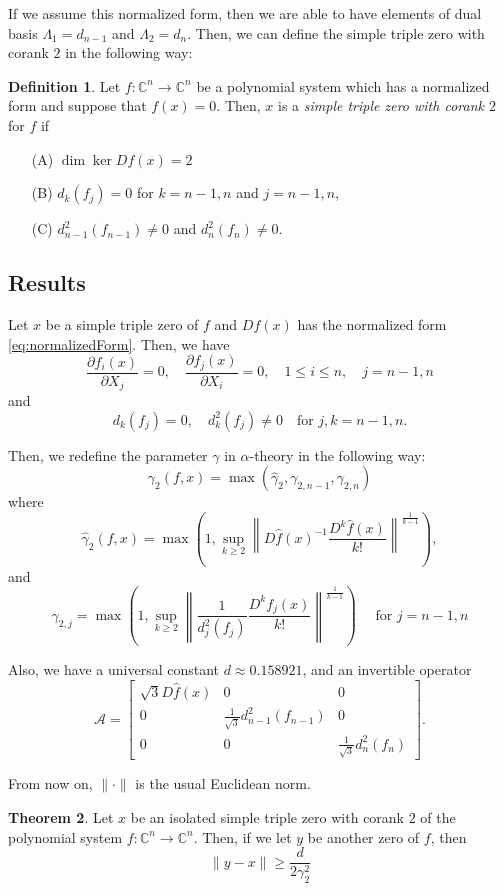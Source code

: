 \documentclass[12pt,oneside,reqno]{amsart}
\theoremstyle{definition}
\newtheorem{thm}{Theorem}
\newtheorem{defi}[thm]{Definition}
\begin{document}
If we assume this normalized form, then we are able to have elements of dual basis $\Lambda_1=d_{n-1}$ and $\Lambda_2=d_n$. Then, we can define the simple triple zero with corank $2$ in the following way:
\begin{defi}
 Let $f:\mathbb{C}^n\rightarrow\mathbb{C}^n$ be a polynomial system which has a normalized form and suppose that $f(x)=0$. Then, $x$ is a {\it simple triple zero with corank $2$} for $f$ if
 \begin{itemize}
 	\item[(A)] $\dim\ker Df(x)=2$
 	\item[(B)] $d_k(f_j)=0$ for $k=n-1,n$ and $j=n-1,n$,
 	\item[(C)] $d_{n-1}^2(f_{n-1})\ne0$ and $d_{n}^2(f_{n})\ne0$.
 	\end{itemize}
	
\end{defi}


\subsection{Results}
Let $x$ be a simple triple zero of $f$ and $Df(x)$ has the normalized form \ref{eq:normalizedForm}. Then, we have 
\[\frac{\partial f_i(x)}{\partial X_j}=0,\quad \frac{\partial f_j(x)}{\partial X_i}=0, \quad 1\leq i\leq n,\quad j=n-1,n\]
and
\[d_k(f_j)=0,\quad d_k^2(f_j)\ne 0\quad \text{for }j,k=n-1,n.\]

Then, we redefine the parameter $\gamma$ in $\alpha$-theory in the following way:
$$\gamma_2(f,x)=\max(\hat{\gamma}_2,\gamma_{2,n-1},\gamma_{2,n})$$
where
\[\hat{\gamma}_2(f,x)=\max\left(1,\sup\limits_{k\geq 2}\left\|D\hat{f}(x)^{-1}\frac{D^k\hat{f}(x)}{k!}\right\|^{\frac{1}{k-1}}\right),\]
and
\[\gamma_{2,j}=\max\left(1,\sup\limits_{k\geq 2}\left\|\frac{1}{d_j^2(f_j)}\frac{D^k f_j(x)}{k!}\right\|^{\frac{1}{k-1}}\right)\quad \text{ for } j=n-1,n\]


Also, we have a universal constant $d\approx0.158921$, and an invertible operator 
\[\mathcal{A}=\begin{bmatrix}
\sqrt{3}D\hat{f}(x) & 0 & 0\\
0 & \frac{1}{\sqrt{3}}d_{n-1}^2(f_{n-1}) & 0 \\
0 & 0 & \frac{1}{\sqrt{3}}d_{n}^2(f_{n})
\end{bmatrix}.\]

From now on, $\|\cdot \|$ is the usual Euclidean norm.
\begin{thm}\label{thm:tripleRootSeparationBound}
	Let $x$ be an isolated simple triple zero with corank $2$ of the polynomial system $f:\mathbb{C}^n\rightarrow\mathbb{C}^n$. Then, if we let $y$ be another zero of $f$, then
	\[\|y-x\|\geq \frac{d}{2\gamma_2^2}\]
\end{thm}
\end{document}
